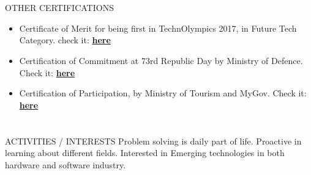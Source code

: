 \documentclass{my_cv}
\begin{document}
\begin{multicols}{2}
\section{\faStar}{OTHER CERTIFICATIONS}

\begin{itemize}[noitemsep]
    \item Certificate of Merit for being first in TechnOlympics 2017, in Future Tech Category.
    check it: \textbf{\href{https://drive.google.com/file/d/1RLxo1emzGHALReSLDn7UjfB2_2hTYwOW/view}{here}}
    \item Certification of Commitment at 73rd Republic Day by Ministry of Defence. Check it: \textbf{\href{https://drive.google.com/file/d/19l8o8HjbIlwEPfwosTMTENgxJ1geFbsB/view?usp=sharing}{here}}
    \item Certification of Participation, by Ministry of Tourism and MyGov. Check it: \textbf{\href{https://drive.google.com/file/d/10gOOfH7SBqizZOaP-F6VMnyDdtaQRh1v/view?usp=sharing}{here}}
\end{itemize}

\section{\faSoccerBallO}{ACTIVITIES / INTERESTS}
Problem solving is daily part of life.
Proactive in learning about different fields.
Interested in Emerging technologies in both hardware and software industry.
\end{multicols}
\end{document}
